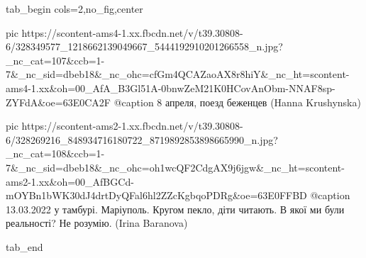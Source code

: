  
 
 
 
 

\begin{minipage}{\textwidth}

\ifcmt
  tab_begin cols=2,no_fig,center

     pic https://scontent-ams4-1.xx.fbcdn.net/v/t39.30808-6/328349577_1218662139049667_5444192910201266558_n.jpg?_nc_cat=107&ccb=1-7&_nc_sid=dbeb18&_nc_ohc=cfGm4QCAZaoAX8r8hiY&_nc_ht=scontent-ams4-1.xx&oh=00_AfA_B3Gl51A-0bnwZeM21K0HCovAnObm-NNAF8sp-ZYFdA&oe=63E0CA2F
     @caption 8 апреля, поезд беженцев (Hanna Krushynska)

     pic https://scontent-ams2-1.xx.fbcdn.net/v/t39.30808-6/328269216_848934716180722_8719892853898665990_n.jpg?_nc_cat=108&ccb=1-7&_nc_sid=dbeb18&_nc_ohc=oh1wcQF2CdgAX9j6jgw&_nc_ht=scontent-ams2-1.xx&oh=00_AfBGCd-mOYBn1bWK30dJ4drtDyQFal6hl2ZZcKgbqoPDRg&oe=63E0FFBD
     @caption 13.03.2022 у тамбурі. Маріуполь. Кругом пекло, діти читають. В якої ми були реальності? Не розумію. (Irina Baranova)

  tab_end
\fi
\end{minipage}
